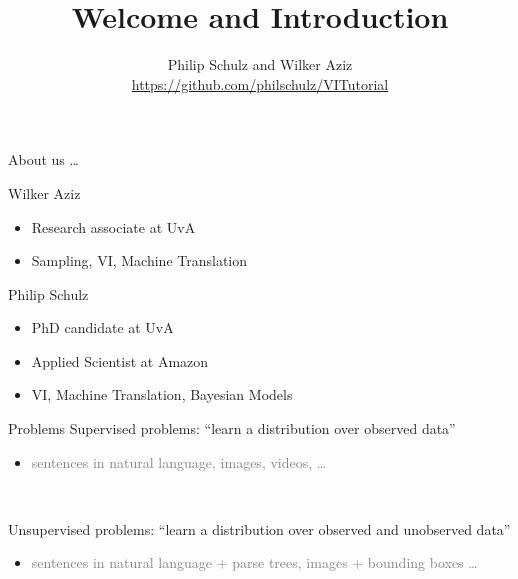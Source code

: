 \documentclass[14pt]{beamer}
\title{Welcome and Introduction}
\date{}
\author[Schulz and Aziz]{Philip Schulz and Wilker Aziz \\
\url{https://github.com/philschulz/VITutorial}}
\begin{document}
\frame{\titlepage}

\begin{frame}{About us \ldots}
\begin{block}{Wilker Aziz}
\begin{itemize}
\item Research associate at UvA
\item Sampling, VI, Machine Translation
\end{itemize}
\end{block}

\begin{block}{Philip Schulz}
\begin{itemize}
\item PhD candidate at UvA
\item Applied Scientist at Amazon
\item VI, Machine Translation, Bayesian Models
\end{itemize}
\end{block}
\end{frame}

\begin{frame}{Problems}
Supervised problems: \alert{``learn a distribution over observed data''}
\begin{itemize}
	\item \textcolor{gray}{sentences in natural language, images, videos, \ldots}
\end{itemize}

~

Unsupervised problems: \alert{``learn a distribution over observed and unobserved data''}
\begin{itemize}
	\item \textcolor{gray}{sentences in natural language + parse trees, images + bounding boxes \ldots}
\end{itemize}
\end{frame}
\end{document}
